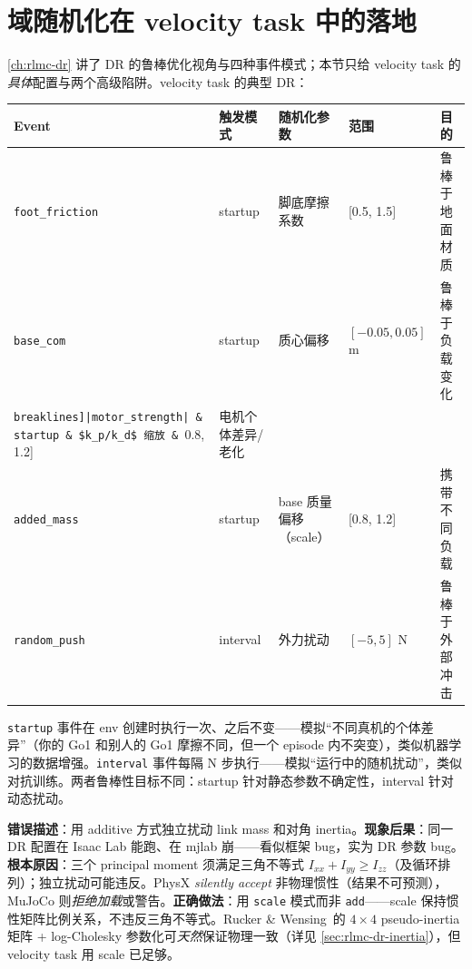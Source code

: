 \section{域随机化在 velocity task 中的落地}
\label{sec:rlmc-ql-dr}

\cref{ch:rlmc-dr} 讲了 DR 的鲁棒优化视角与四种事件模式；本节只给 velocity task 的\emph{具体}配置与两个高级陷阱。velocity task 的典型 DR：

\begin{center}
\small
\begin{tabular}{@{}lllll@{}}
\toprule
Event & 触发模式 & 随机化参数 & 范围 & 目的 \\
\midrule
\verb|foot_friction| & startup & 脚底摩擦系数 & [0.5, 1.5] & 鲁棒于地面材质 \\
\verb|base_com| & startup & 质心偏移 & $[-0.05,0.05]$ m & 鲁棒于负载变化 \\
\Verb[breaklines]|motor_strength| & startup & $k_p/k_d$ 缩放 & [0.8, 1.2] & 电机个体差异/老化 \\
\verb|added_mass| & startup & base 质量偏移（scale） & [0.8, 1.2] & 携带不同负载 \\
\verb|random_push| & interval & 外力扰动 & $[-5,5]$ N & 鲁棒于外部冲击 \\
\bottomrule
\end{tabular}
\end{center}

\begin{insight}\label{ins:rlmc-ql-dr}
\verb|startup| 事件在 env 创建时执行一次、之后不变——模拟“不同真机的个体差异”（你的 Go1 和别人的 Go1 摩擦不同，但一个 episode 内不突变），类似机器学习的数据增强。\verb|interval| 事件每隔 N 步执行——模拟“运行中的随机扰动”，类似对抗训练。两者鲁棒性目标不同：startup 针对静态参数不确定性，interval 针对动态扰动。
\end{insight}

\begin{pitfall}
\textbf{错误描述}：用 additive 方式独立扰动 link mass 和对角 inertia。\textbf{现象后果}：同一 DR 配置在 Isaac Lab 能跑、在 mjlab 崩——看似框架 bug，实为 DR 参数 bug。\textbf{根本原因}：三个 principal moment 须满足三角不等式 $I_{xx}+I_{yy}\ge I_{zz}$（及循环排列）；独立扰动可能违反。PhysX \emph{silently accept} 非物理惯性（结果不可预测），MuJoCo 则\emph{拒绝加载}或警告。\textbf{正确做法}：用 \verb|scale| 模式而非 \verb|add|——scale 保持惯性矩阵比例关系，不违反三角不等式。Rucker \& Wensing\,\cite{rucker2022pseudoinertia} 的 $4\times 4$ pseudo-inertia 矩阵 + log-Cholesky 参数化可\emph{天然}保证物理一致（详见 \cref{sec:rlmc-dr-inertia}），但 velocity task 用 scale 已足够。
\end{pitfall}

